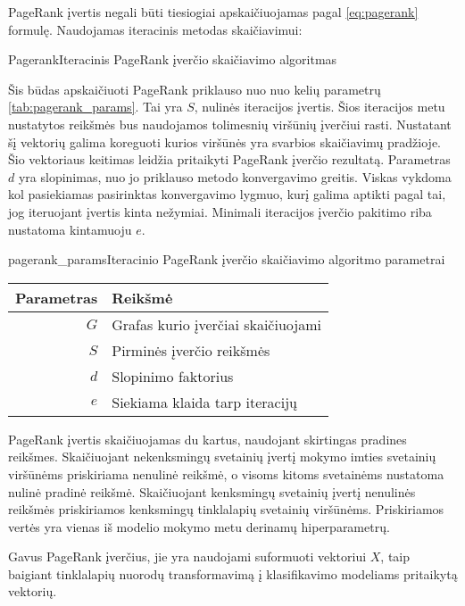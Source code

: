 PageRank įvertis negali būti tiesiogiai apskaičiuojamas pagal \ref{eq:pagerank} formulę. Naudojamas iteracinis metodas  skaičiavimui:

\begin{ktualgo}{Pagerank}{Iteracinis PageRank įverčio skaičiavimo algoritmas}
\Repeat
{}
\EndFor{}
\EndFor{}
\end{ktualgo}

Šis būdas apskaičiuoti PageRank priklauso nuo nuo kelių parametrų \vref{tab:pagerank_params}. Tai yra $S$, nulinės iteracijos įvertis. Šios iteracijos metu nustatytos reikšmės bus naudojamos tolimesnių viršūnių įverčiui rasti. Nustatant šį vektorių galima koreguoti kurios viršūnės yra svarbios skaičiavimų pradžioje. Šio vektoriaus keitimas leidžia pritaikyti PageRank įverčio rezultatą. Parametras $d$ yra slopinimas, nuo jo priklauso metodo konvergavimo greitis. Viskas vykdoma kol pasiekiamas pasirinktas konvergavimo lygmuo, kurį galima aptikti pagal tai, jog iteruojant įvertis kinta nežymiai. Minimali iteracijos įverčio pakitimo riba nustatoma kintamuoju $e$.

\begin{ktutable}{pagerank_params}{Iteracinio PageRank įverčio skaičiavimo algoritmo parametrai}
    \begin{tabular}{ | r | l | }
        \hline
        Parametras & Reikšmė \\ \hline
        $G$ & Grafas kurio įverčiai skaičiuojami \\ \hline
        $S$ & Pirminės įverčio reikšmės \\ \hline
        $d$ & Slopinimo faktorius \\ \hline
        $e$ & Siekiama klaida tarp iteracijų \\ \hline
    \end{tabular}
\end{ktutable}

PageRank įvertis skaičiuojamas du kartus, naudojant skirtingas pradines reikšmes. Skaičiuojant nekenksmingų svetainių įvertį mokymo imties svetainių viršūnėms priskiriama nenulinė reikšmė, o visoms kitoms svetainėms nustatoma nulinė pradinė reikšmė. Skaičiuojant kenksmingų svetainių įvertį nenulinės reikšmės priskiriamos kenksmingų tinklalapių svetainių viršūnėms. Priskiriamos vertės yra vienas iš modelio mokymo metu derinamų hiperparametrų.

Gavus PageRank įverčius, jie yra naudojami suformuoti vektoriui $X$, taip baigiant tinklalapių nuorodų transformavimą į klasifikavimo modeliams pritaikytą vektorių.

